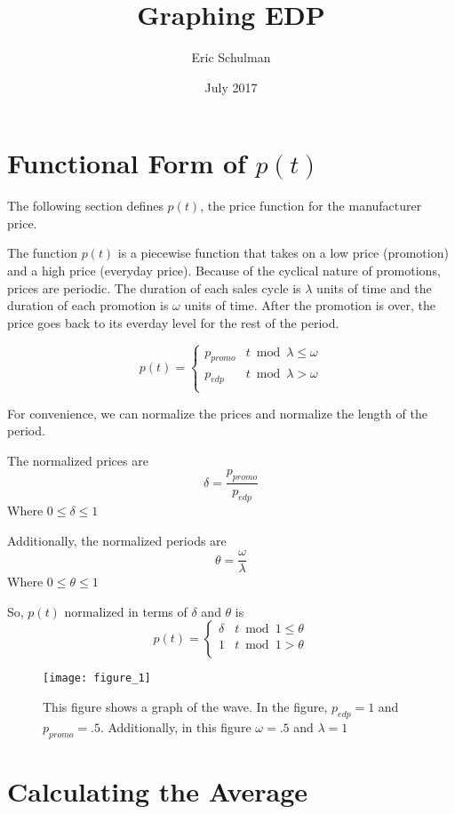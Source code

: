 \documentclass{article}
\title{Graphing EDP}
\author{Eric Schulman}
\date{July 2017}
\begin{document}
\maketitle

\section{Functional Form of $p(t)$}

The following section defines $p(t)$, the price function for the manufacturer price. 

The function $p(t)$ is a piecewise function that takes on a low price (promotion) and a high price (everyday price). Because of the cyclical nature of promotions, prices are periodic. The duration of each sales cycle is $\lambda$ units of time and the duration of each promotion is $\omega$ units of time. After the promotion is over, the price goes back to its everday level for the rest of the period.


$$p(t) =  \begin{cases} p_{promo} & t \bmod  \lambda \leq \omega \\ p_{edp} &  t \bmod  \lambda > \omega \\ \end{cases} $$

For convenience, we can normalize the prices and normalize the length of the period. 

The normalized prices are
$$\delta = \dfrac{p_{promo}}{p_{edp}}$$ 
Where $0 \leq \delta \leq 1$

Additionally, the normalized periods are
$$\theta = \dfrac{\omega}{\lambda}$$ 
Where $0 \leq \theta \leq 1$

So, $p(t)$ normalized in terms of $\delta$ and $\theta$ is 
$$p(t) =  \begin{cases} \delta & t \bmod  1 \leq \theta \\ 1 &  t \bmod  1 > \theta \\ \end{cases} $$


\begin{figure}
\centering
\texttt{[image: figure\_1]}
\caption{This figure shows a graph of the wave. In the figure, $p_{edp} = 1$ and $p_{promo} = .5$. Additionally, in this figure $\omega = .5$ and $\lambda = 1$}
\label{figure_1}
\end{figure}


\section{Calculating the Average}
\end{document}
